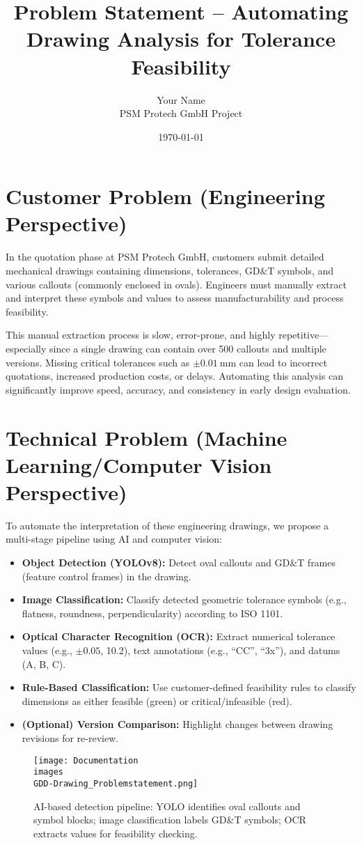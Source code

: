 \documentclass[a4paper,12pt]{article}
\title{\textbf{Problem Statement -- Automating Drawing Analysis for Tolerance Feasibility}}
\author{Your Name \\ PSM Protech GmbH Project}
\date{\today}
\begin{document}
\maketitle

\section*{Customer Problem (Engineering Perspective)}

In the quotation phase at PSM Protech GmbH, customers submit detailed mechanical drawings containing dimensions, tolerances, GD\&T symbols, and various callouts (commonly enclosed in ovals). Engineers must manually extract and interpret these symbols and values to assess manufacturability and process feasibility.

This manual extraction process is slow, error-prone, and highly repetitive---especially since a single drawing can contain over 500 callouts and multiple versions. Missing critical tolerances such as $\pm 0.01~\text{mm}$ can lead to incorrect quotations, increased production costs, or delays. Automating this analysis can significantly improve speed, accuracy, and consistency in early design evaluation.

\section*{Technical Problem (Machine Learning/Computer Vision Perspective)}

To automate the interpretation of these engineering drawings, we propose a multi-stage pipeline using AI and computer vision:

\begin{itemize}
  \item \textbf{Object Detection (YOLOv8):} Detect oval callouts and GD\&T frames (feature control frames) in the drawing.
  \item \textbf{Image Classification:} Classify detected geometric tolerance symbols (e.g., flatness, roundness, perpendicularity) according to ISO 1101.
  \item \textbf{Optical Character Recognition (OCR):} Extract numerical tolerance values (e.g., $\pm 0.05$, 10.2), text annotations (e.g., ``CC'', ``3x''), and datums (A, B, C).
  \item \textbf{Rule-Based Classification:} Use customer-defined feasibility rules to classify dimensions as either feasible (green) or critical/infeasible (red).
  \item \textbf{(Optional) Version Comparison:} Highlight changes between drawing revisions for re-review.
\end{itemize}

\begin{figure}[h!]
  \centering
  \texttt{[image: Documentation\\images\\GDD-Drawing\_Problemstatement.png]}
  \caption{AI-based detection pipeline: YOLO identifies oval callouts and symbol blocks; image classification labels GD\&T symbols; OCR extracts values for feasibility checking.}
  \label{fig:pipeline_example}
\end{figure}
\end{document}
